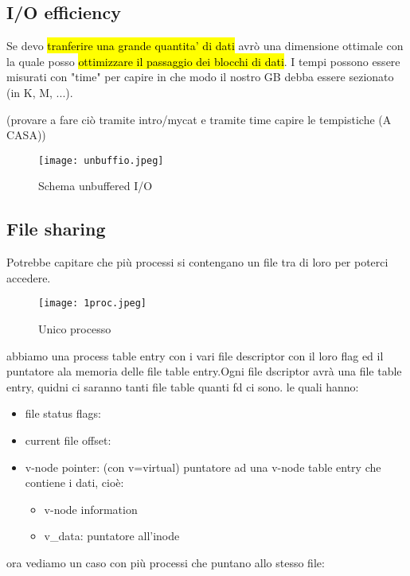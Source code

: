 \subsection{I/O efficiency}

Se devo \hl{tranferire una grande quantita' di dati} avrò una dimensione ottimale con la quale posso \hl{ottimizzare il passaggio dei blocchi di dati}. I tempi possono essere misurati con "time" per capire in che modo il nostro GB debba essere sezionato (in K, M, ...).

(provare a fare ciò tramite intro/mycat e tramite time capire le tempistiche (A CASA))

\begin{figure}[H]
\centering
\texttt{[image: unbuffio.jpeg]}
\caption{Schema unbuffered I/O} 
\label{unbuffio}
\end{figure}


\subsection{File sharing}

Potrebbe capitare che più processi si contengano un file tra di loro per poterci accedere.


\begin{figure}[H]
\centering
\texttt{[image: 1proc.jpeg]}
\caption{Unico processo} 
\label{1proc}
\end{figure}


abbiamo una process table entry con i vari file descriptor con il loro flag ed il puntatore ala memoria delle file table entry.Ogni file dscriptor avrà una file table entry, quidni ci saranno tanti file table quanti fd ci sono. le quali hanno:

\begin{itemize}
	\item file status flags: 
	\item current file offset: 
	\item v-node pointer: (con v=virtual) puntatore ad una v-node table entry che contiene i dati, cioè:
		\begin{itemize}
			\item v-node information
			\item v\_data: puntatore all'inode
		\end{itemize}
\end{itemize}


ora vediamo un caso con più processi che puntano allo stesso file:


